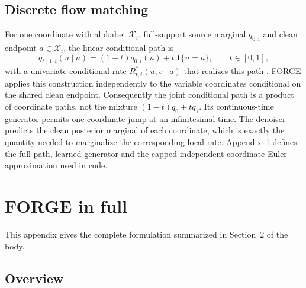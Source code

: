 \documentclass{article}
\begin{document}
\subsection{Discrete flow matching}

For one coordinate with alphabet $\mathcal X_i$, full-support source marginal $q_{0,i}$ and clean
endpoint $a\in\mathcal X_i$, the linear conditional path is
\begin{equation}
    q_{t\mid1,i}(u\mid a)
    = (1-t)q_{0,i}(u) + t\,\mathbf 1\{u=a\},
    \qquad t\in[0,1],
\end{equation}
with a univariate conditional rate $R^*_{t,i}(u,v\mid a)$ that realizes this path
\citep{qin2025defog}. FORGE applies this construction independently to the variable coordinates
conditional on the shared clean endpoint. Consequently the joint conditional path is a product of
coordinate paths, not the mixture $(1-t)q_0+tq_1$. Its continuous-time generator permits one
coordinate jump at an infinitesimal time. The denoiser predicts the clean posterior marginal of each
coordinate, which is exactly the quantity needed to marginalize the corresponding local rate.
Appendix~\ref{app:forge} defines the full path, learned generator and the capped
independent-coordinate Euler approximation used in code.

\clearpage

\section{FORGE in full}
\label{app:forge}

This appendix gives the complete formulation summarized in Section~2 of the body.

\subsection{Overview}
\end{document}
